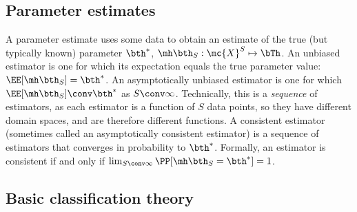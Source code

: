 


\subsection{Parameter estimates} %
\label{sub:estimators}

A parameter estimate uses some data to obtain an estimate of the true (but typically known) parameter $\bth^*$, $\hth_S: \mc{X}^S \mapsto \bTh$.  An unbiased estimator is one for which its expectation equals the true parameter value: $\EE[\hth_S] = \bth^*$.  An asymptotically unbiased estimator is one for which $\EE[\hth_S] \conv \bth^*$ as $S \conv \infty$. Technically, this is a \emph{sequence} of estimators, as each estimator is a function of $S$ data points, so they have different domain spaces, and are therefore different functions.   A consistent estimator (sometimes called an asymptotically consistent estimator) is a sequence of estimators that converges in probability to $\bth^*$. Formally, an estimator is consistent if and only if $\lim_{S\conv \infty} \PP[\hth_S=\bth^*]=1$.





\subsection{Basic classification theory} %
\label{sub:basic_classification_theory}


